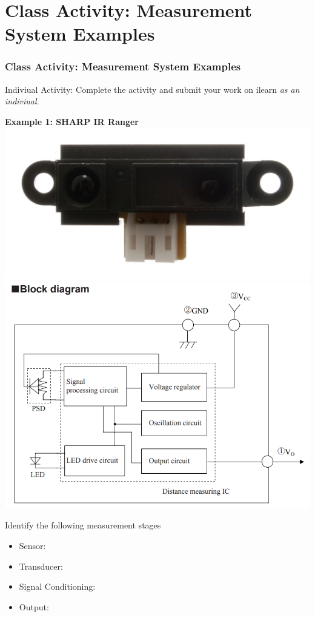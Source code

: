 \documentclass[fleqn]{beamer} %
\newcommand{\sectiontitleV}{Class Activity: Measurement System Examples}
\begin{document}
\section{\sectiontitleV}
	\begin{frame}[label=sectionV]
		\frametitle{\sectiontitleV}
			\tiny
		
		Indiviual Activity: Complete the activity and submit your work on ilearn {\it as an indiviual}.

	        \begin{multicols}{2}
		
		    \textbf{Example 1: SHARP IR Ranger } \vspc
		    \includegraphics[scale=0.5]{proximity_sensor.jpg}
		    \includegraphics[scale=0.15]{sharp_ranger_circuit.png} \vspccc

		    Identify the following measurement stages 
		    \begin{itemize}
		    	\item Sensor: \hspcu
		    	\item Transducer: \hspcu
		    	\item Signal Conditioning: \hspcu
		    	\item Output: \hspcu
		    \end{itemize}



\end{multicols}
\end{frame}
\end{document}
